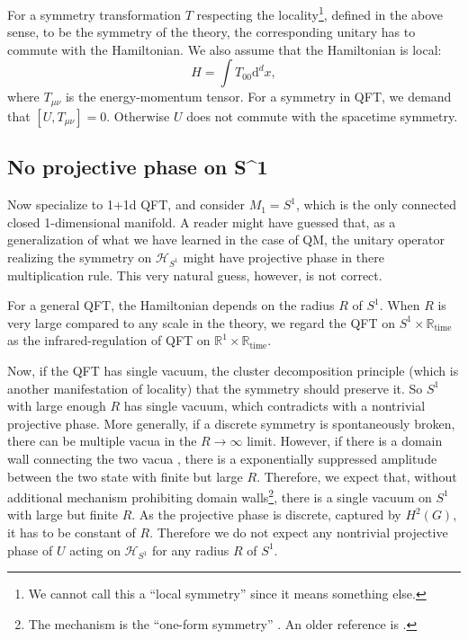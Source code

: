 \documentclass[
]{scrartcl}
\numberwithin{equation}{section}
\theoremstyle{definition}
\theoremstyle{definition}
\theoremstyle{definition}
\theoremstyle{definition}
\theoremstyle{remark}
\begin{document}
For a symmetry transformation \(T\) respecting the locality\footnote{We cannot call this a ``local symmetry'' since it means something else.}, defined in the above sense, to be the symmetry of the theory, the corresponding unitary has to commute with the Hamiltonian.
We also assume that the Hamiltonian is local:
\begin{equation}
    \label{eq:localHam}
    H = \int T_{00} \mathrm{d}^dx,
\end{equation}
where \(T_{\mu\nu}\) is the energy-momentum tensor.
For a symmetry in QFT, we demand that \([U,T_{\mu\nu}] = 0\). Otherwise \(U\) does not commute with the spacetime symmetry.

\hypertarget{noproj}{%
\subsection{No projective phase on S\^{}1}\label{noproj}}

Now specialize to 1+1d QFT, and consider \(M_1 = S^1\), which is the only connected closed 1-dimensional manifold.
A reader might have guessed that, as a generalization of what we have learned in the case of QM, the unitary operator realizing the symmetry on \(\mathcal{H}_{S^1}\) might have projective phase in there multiplication rule.
This very natural guess, however, is not correct.

For a general QFT, the Hamiltonian depends on the radius \(R\) of \(S^1\).
When \(R\) is very large compared to any scale in the theory, we regard the QFT on \(S^1\times \mathbb{R}_\text{time}\) as the infrared-regulation of QFT on \(\mathbb{R}^1\times \mathbb{R}_\text{time}\).

Now, if the QFT has single vacuum, the cluster decomposition principle (which is another manifestation of locality) that the symmetry should preserve it. So \(S^1\) with large enough \(R\) has single vacuum, which contradicts with a nontrivial projective phase.
More generally, if a discrete symmetry is spontaneously broken,
there can be multiple vacua in the \(R\to \infty\) limit.
However, if there is a domain wall connecting the two vacua , there is a exponentially suppressed
amplitude between the two state with finite but large \(R\).
Therefore, we expect that, without additional mechanism prohibiting domain walls\footnote{The mechanism is the ``one-form symmetry'' \autocite{Komargodski:2020mxz}. An older reference is \autocite{Hellerman:2006zs}.}, there is a single vacuum on \(S^1\) with large but finite \(R\).
As the projective phase is discrete, captured by \(H^2(G)\), it has to be constant of \(R\). Therefore we do not expect any nontrivial projective phase of \(U\) acting on \(\mathcal{H}_{S^1}\) for any radius \(R\) of \(S^1\).
\end{document}
